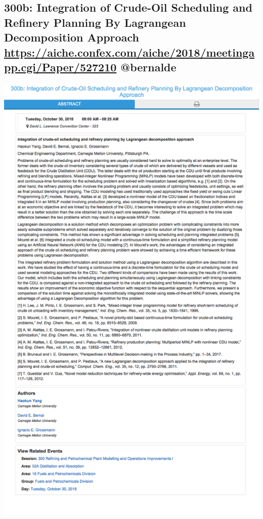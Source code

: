 \documentclass[11pt]{article}
\begin{document}
\subsection{300b: Integration of Crude-Oil Scheduling and Refinery Planning By Lagrangean Decomposition Approach \url{https://aiche.confex.com/aiche/2018/meetingapp.cgi/Paper/527210} @bernalde}
\label{sec:orga1cc04b}
\begin{center}
\includegraphics[width=.9\linewidth]{./527210.png}
\end{center}
\end{document}
